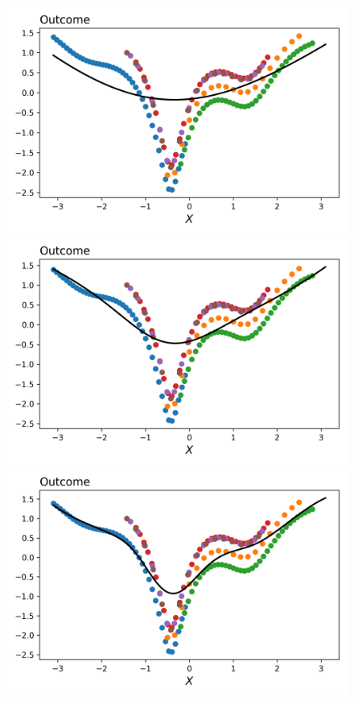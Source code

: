 \documentclass[a4paper,12pt]{article}
\begin{document}
\begin{figure}[htbp]
\centering
\includegraphics[scale=0.3]{figures/framework/local_linear_no_const_0.5_18_LM.png}
\includegraphics[scale=0.3]{figures/framework/local_linear_no_const_1.0_18_LM.png}
\includegraphics[scale=0.3]{figures/framework/local_linear_no_const_2.0_18_LM.png}

\end{figure}
\end{document}
